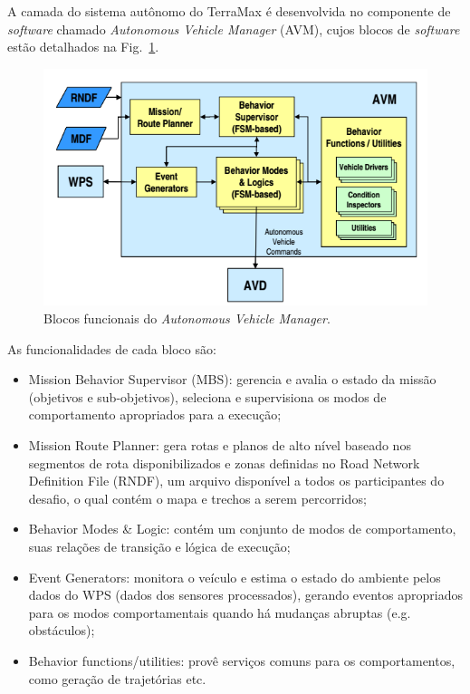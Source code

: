 A camada do sistema autônomo do TerraMax é desenvolvida no componente de \emph{software} chamado
\textit{Autonomous Vehicle Manager} (AVM), cujos blocos de \emph{software} estão
detalhados na Fig.~\ref{fig:avm}.

\begin{figure}[!ht]
\centering
\includegraphics[width=\columnwidth]{figs/AVM}
\caption{Blocos funcionais do \textit{Autonomous Vehicle Manager}.}
\label{fig:avm}
\end{figure}

As funcionalidades de cada bloco são:

\begin{itemize}
  \item Mission Behavior Supervisor (MBS): gerencia e avalia o estado
  da missão (objetivos e sub-objetivos), seleciona e supervisiona os modos de comportamento apropriados
  para a execução;
  \item Mission Route Planner: gera rotas e planos de alto nível baseado nos
  segmentos de rota disponibilizados e zonas definidas no Road Network
  Definition File (RNDF), um arquivo disponível a todos os participantes do
  desafio, o qual contém o mapa e trechos a serem percorridos;
  \item Behavior Modes \& Logic: contém um conjunto de modos de comportamento,
  suas relações de transição e lógica de execução;
  \item Event Generators: monitora o veículo e estima o estado do ambiente pelos
  dados do WPS (dados dos sensores processados), gerando eventos apropriados
  para os modos comportamentais quando há mudanças abruptas (e.g. obstáculos);
  \item Behavior functions/utilities: provê serviços comuns para os
  comportamentos, como geração de trajetórias etc.
\end{itemize}


